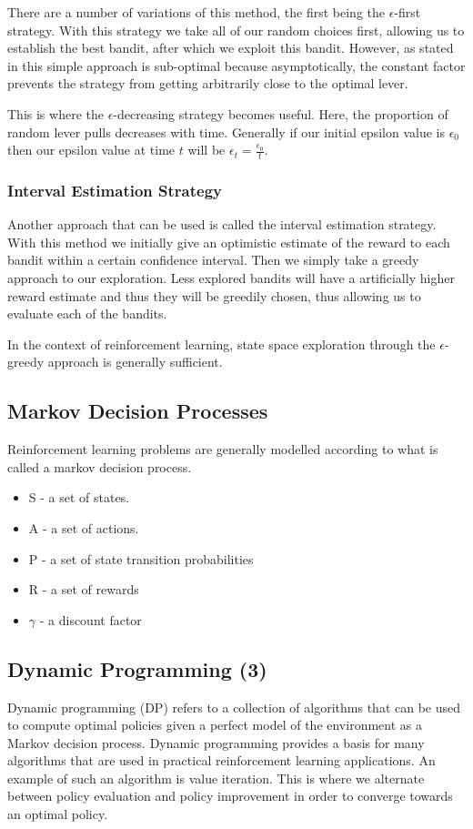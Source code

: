 There are a number of variations of this method, the first being the $\epsilon$-first strategy.
With this strategy we take all of our random choices first, allowing us to establish the best bandit,
after which we exploit this bandit.
However, as stated in\citep{vermorel2005multi} this simple approach is sub-optimal because asymptotically,
the constant factor prevents the strategy from getting arbitrarily close to
the optimal lever.

This is where the $\epsilon$-decreasing strategy becomes useful.
Here, the proportion of random lever pulls decreases with time.
Generally if our initial epsilon value is $\epsilon_0$ then our epsilon value at time $t$ will be
$\epsilon_t = \frac{\epsilon_0}{t}$.

\subsubsection{Interval Estimation Strategy}
Another approach that can be used is called the interval estimation strategy.
With this method we initially give an optimistic estimate of the reward to each bandit within a certain
confidence interval.
Then we simply take a greedy approach to our exploration.
Less explored bandits will have a artificially higher reward estimate and thus they will be greedily chosen,
thus allowing us to evaluate each of the bandits.

In the context of reinforcement learning, state space exploration through the $\epsilon$-greedy approach is
generally sufficient.


\subsection{Markov Decision Processes}\label{subsec:mdp}
Reinforcement learning problems are generally modelled according to what is called a markov decision process.

\begin{itemize}
    \item S - a set of states.
    \item A - a set of actions.
    \item P - a set of state transition probabilities
    \item R - a set of rewards
    \item $\gamma$ - a discount factor
\end{itemize}

\subsection{Dynamic Programming (3)}\label{subsec:dp}
Dynamic programming (DP) refers to a collection of algorithms that can be used to compute optimal policies given a
perfect model of the environment as a Markov decision process\citep{sutton1998reinforcement}.
Dynamic programming provides a basis for many algorithms that are used in practical reinforcement learning applications.
An example of such an algorithm is value iteration.
This is where we alternate between policy evaluation and policy improvement in order to converge towards an optimal
policy.

